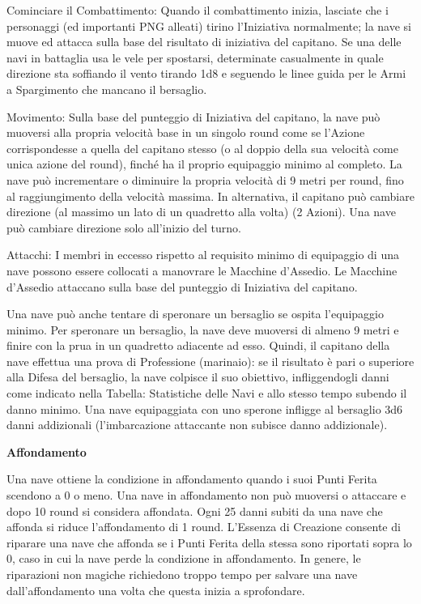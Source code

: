 \documentclass[a4paper,11pt,twoside,openany]{book}
\begin{document}
{{Cominciare il Combattimento:} Quando il combattimento inizia, lasciate che i personaggi (ed importanti PNG alleati) tirino l'Iniziativa normalmente; la nave si muove ed attacca sulla base del risultato di iniziativa del capitano. Se una delle navi in battaglia usa le vele per spostarsi, determinate casualmente in quale direzione sta soffiando il vento tirando 1d8 e seguendo le linee guida per le Armi a Spargimento che mancano il bersaglio.{}

{Movimento:} Sulla base del punteggio di Iniziativa del capitano, la nave può muoversi alla propria velocità base in un singolo round come se l'Azione corrispondesse a quella del capitano stesso (o al doppio della sua velocità come unica azione del round), finché ha il proprio equipaggio minimo al completo. La nave può incrementare o diminuire la propria velocità di 9 metri per round, fino al raggiungimento della velocità massima. In alternativa, il capitano può cambiare direzione (al massimo un lato di un quadretto alla volta) (2 Azioni). Una nave può cambiare direzione solo all'inizio del turno.{}

{Attacchi:} I membri in eccesso rispetto al requisito minimo di equipaggio di una nave possono essere collocati a manovrare le Macchine d'Assedio. Le Macchine d'Assedio attaccano sulla base del punteggio di Iniziativa del capitano.{}

Una nave può anche tentare di speronare un bersaglio se ospita l'equipaggio minimo. Per speronare un bersaglio, la nave deve muoversi di almeno 9 metri e finire con la prua in un quadretto adiacente ad esso. 
Quindi, il capitano della nave effettua una prova di Professione (marinaio): se il risultato è pari o superiore alla Difesa del bersaglio, la nave colpisce il suo obiettivo, infliggendogli danni come indicato nella Tabella: Statistiche delle Navi e allo stesso tempo subendo il danno minimo. Una nave equipaggiata con uno sperone infligge al bersaglio 3d6 danni addizionali (l'imbarcazione attaccante non subisce danno addizionale).

\textbf{Affondamento}

Una nave ottiene la condizione in affondamento quando i suoi Punti Ferita scendono a 0 o meno. Una nave in affondamento non può muoversi o attaccare e dopo 10 round si considera affondata. Ogni 25 danni subiti da una nave che affonda si riduce l'affondamento di 1 round. L’Essenza di Creazione consente di riparare una nave che affonda se i Punti Ferita della stessa sono riportati sopra lo 0, caso in cui la nave perde la condizione in affondamento. In genere, le riparazioni non magiche richiedono troppo tempo per salvare una nave dall'affondamento una volta che questa inizia a sprofondare.

}
\end{document}
